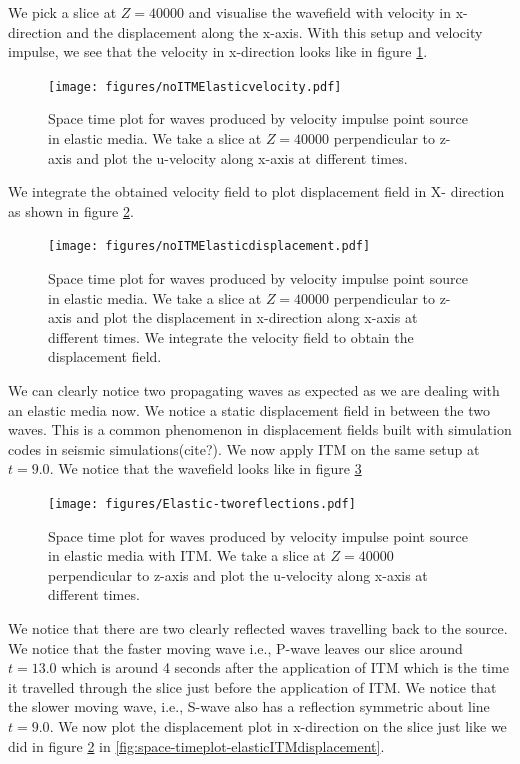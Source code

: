 We pick a slice at $Z = 40000$ and visualise the wavefield with velocity in x-direction and the displacement along the x-axis. With this setup and velocity impulse, 
we see that the velocity in x-direction looks like in figure \ref{fig:space-timeplot-elasticnoITM}.

\begin{figure}
    \centering
    \texttt{[image: figures/noITMElasticvelocity.pdf]}
    \caption{Space time plot for waves produced by velocity impulse point source in elastic media. We take a slice at $Z=40000$ perpendicular to z-axis
    and plot the u-velocity along x-axis at different times.}
    \label{fig:space-timeplot-elasticnoITM}
\end{figure}

We integrate the obtained velocity field to plot displacement field in X- direction as shown in figure \ref{fig:space-timeplot-elasticnoITMdisplacement}.

\begin{figure}
    \centering
    \texttt{[image: figures/noITMElasticdisplacement.pdf]}
    \caption{Space time plot for waves produced by velocity impulse point source in elastic media. We take a slice at $Z=40000$ perpendicular to z-axis
    and plot the displacement in x-direction along x-axis at different times. We integrate the velocity field to obtain the displacement field.}
    \label{fig:space-timeplot-elasticnoITMdisplacement}
\end{figure}

We can clearly notice two propagating waves as expected as we are dealing with an elastic media now. We notice a static displacement field in between the two waves.
This is a common phenomenon in displacement fields built with simulation codes in seismic simulations(cite?). 
We now apply \ac{ITM} on the same setup at $t=9.0$. We notice that the wavefield looks like in figure \ref{fig:space-timeplot-elasticITM}

\begin{figure}
    \centering
    \texttt{[image: figures/Elastic-tworeflections.pdf]}
    \caption{Space time plot for waves produced by velocity impulse point source in elastic media with \ac{ITM}. We take a slice at $Z=40000$ perpendicular to z-axis
    and plot the u-velocity along x-axis at different times.}
    \label{fig:space-timeplot-elasticITM}
\end{figure}

We notice that there are two clearly reflected waves travelling back to the source. We notice that the faster moving wave i.e., P-wave leaves our slice around 
$t=13.0$ which is around 4 seconds after the application of \ac{ITM} which is the time it travelled through the slice just before the application of \ac{ITM}. 
We notice that the slower moving wave, i.e., S-wave also has a reflection symmetric about line $t=9.0$. We now plot the displacement plot in x-direction on the 
slice just like we did in figure \ref{fig:space-timeplot-elasticnoITMdisplacement} in \ref{fig:space-timeplot-elasticITMdisplacement}.

